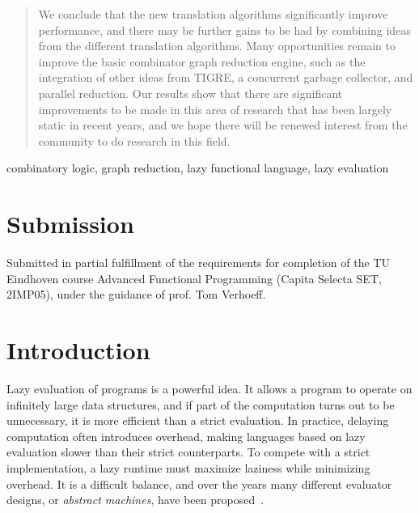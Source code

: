 \documentclass[conference]{IEEEtran}
\begin{document}
\begin{abstract}
    We conclude that the new translation algorithms significantly improve performance, and there may be further gains to be had by combining ideas from the different translation algorithms.
    Many opportunities remain to improve the basic combinator graph reduction engine, such as the integration of other ideas from TIGRE, a concurrent garbage collector, and parallel reduction.
    Our results show that there are significant improvements to be made in this area of research that has been largely static in recent years, and we hope there will be renewed interest from the community to do research in this field.
\end{abstract}

\begin{IEEEkeywords}
    combinatory logic, graph reduction, lazy functional language, lazy evaluation
\end{IEEEkeywords}

\section{Submission}
Submitted in partial fulfillment of the requirements for completion of the TU Eindhoven course Advanced Functional Programming (Capita Selecta SET, 2IMP05), under the guidance of prof. Tom Verhoeff.

\section{Introduction}
Lazy evaluation of programs is a powerful idea.
It allows a program to operate on infinitely large data structures, and if part of the computation turns out to be unnecessary, it is more efficient than a strict evaluation.
In practice, delaying computation often introduces overhead, making languages based on lazy evaluation slower than their strict counterparts.
To compete with a strict implementation, a lazy runtime must maximize laziness while minimizing overhead.
It is a difficult balance, and over the years many different evaluator designs, or \textit{abstract machines}, have been proposed~\cite{turner_new_1979,kieburtz_g-machine_1985,fairbairn_tim_1987,burn_spineless_1988,koopman_fresh_1989,jones_implementing_nodate}.
\end{document}
